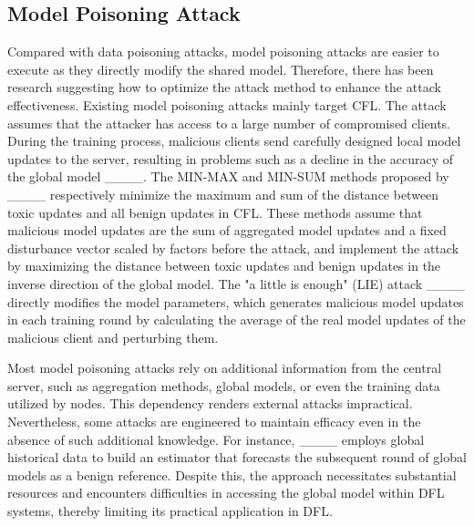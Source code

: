 \subsection{Model Poisoning Attack}
Compared with data poisoning attacks, model poisoning attacks are easier to execute as they directly modify the shared model. Therefore, there has been research suggesting how to optimize the attack method to enhance the attack effectiveness. Existing model poisoning attacks mainly target CFL. The attack assumes that the attacker has access to a large number of compromised clients. During the training process, malicious clients send carefully designed local model updates to the server, resulting in problems such as a decline in the accuracy of the global model ____. The MIN-MAX and MIN-SUM methods proposed by ____ respectively minimize the maximum and sum of the distance between toxic updates and all benign updates in CFL. These methods assume that malicious model updates are the sum of aggregated model updates and a fixed disturbance vector scaled by factors before the attack, and implement the attack by maximizing the distance between toxic updates and benign updates in the inverse direction of the global model. 
The "a little is enough" (LIE) attack ____ directly modifies the model parameters, which generates malicious model updates in each training round by calculating the average of the real model updates of the malicious client and perturbing them. %

Most model poisoning attacks rely on additional information from the central server, such as aggregation methods, global models, or even the training data utilized by nodes. This dependency renders external attacks impractical. Nevertheless, some attacks are engineered to maintain efficacy even in the absence of such additional knowledge. For instance, ____ employs global historical data to build an estimator that forecasts the subsequent round of global models as a benign reference. Despite this, the approach necessitates substantial resources and encounters difficulties in accessing the global model within DFL systems, thereby limiting its practical application in DFL.

